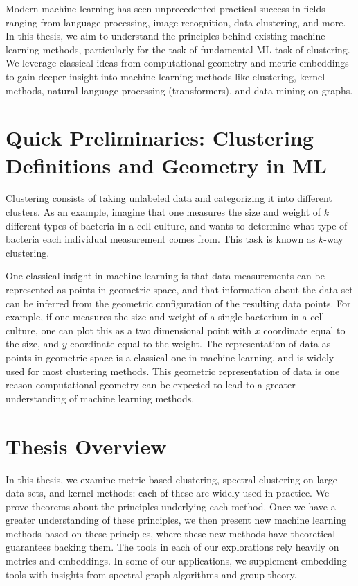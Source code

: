 Modern machine learning has seen unprecedented practical success in fields ranging
from language processing, image recognition, data clustering, and more.
In this thesis, we aim to understand the principles behind existing
machine learning methods, particularly for the task of fundamental ML
task of clustering. We
leverage classical ideas from computational geometry and metric embeddings to gain deeper
insight into machine learning methods like clustering, kernel methods,
        natural language processing (transformers), and data mining on
        graphs.

\setcounter{section}{-1}
\section{Quick Preliminaries: Clustering Definitions and Geometry in ML}

Clustering consists of taking unlabeled data and categorizing it into different
clusters. As an example, imagine that one measures the size and weight
of
$k$ different types of bacteria in a cell culture, and wants to determine
what type of bacteria each individual measurement comes from.  This task
is known as $k$-way clustering. 

One classical insight in machine learning is that data measurements can
be represented as points in geometric space, and that information about
the data set can be inferred from the geometric configuration of the
resulting data points. For example, if one measures the size and weight
of a single bacterium in a cell culture, one can plot this as a two
dimensional point with $x$ coordinate equal to the size, and $y$
coordinate equal to the weight. The representation of data as points in
geometric space is a classical one in machine learning, and is widely
used for most clustering methods. This geometric
representation of data is one reason computational geometry can be expected to
lead to a greater understanding of machine learning methods.


\section{Thesis Overview}

In this thesis, we examine metric-based clustering, spectral clustering
on large data sets, and kernel methods: each of these are widely used in
practice. We prove theorems about the principles underlying each method.
Once we have a greater understanding of these principles, we then
present new machine learning methods based on these principles, where
these new methods have theoretical guarantees backing them.
The tools in each of our explorations rely heavily on metrics and
embeddings.  In some of our applications, we supplement embedding tools with insights
from spectral graph algorithms and group theory.

